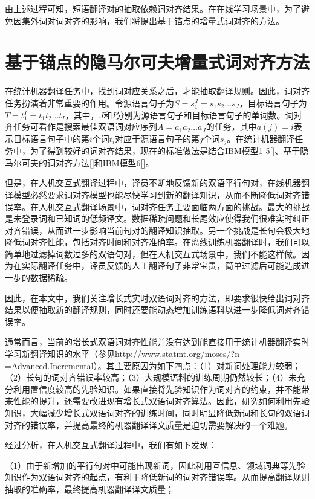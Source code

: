 由上述过程可知，短语翻译对的抽取依赖词对齐结果。在在线学习场景中，为了避免因集外词对词对齐的影响，我们将提出基于锚点的增量式词对齐的方法。

\section{基于锚点的隐马尔可夫增量式词对齐方法}

在统计机器翻译任务中，找到词对应关系之后，才能抽取翻译规则。因此，词对齐任务扮演着非常重要的作用。令源语言句子为$S=s_1^J=s_1s_2\ldots s_J$，目标语言句子为$T=t_1^I=t_1t_2\ldots t_I$，其中，$J$和$I$分别为源语言句子和目标语言句子的单词数。词对齐任务可看作是搜索最佳双语词对应序列$A=a_1a_2\ldots a_J$的任务，其中$a(j)=i$表示目标语言句子中的第$i$个词$t_i$对应于源语言句子的第$j$个词$s_j$。在统计机器翻译任务中，为了得到较好的词对齐结果，现在的标准做法是结合IBM模型1-5[\cite{Brown:1993}]、基于隐马尔可夫的词对齐方法[\cite{Vogel:1996}]和IBM模型6[\cite{Och:2003b}]。

但是，在人机交互式翻译过程中，译员不断地反馈新的双语平行句对，在线机器翻译模型必然要求词对齐模型也能尽快学习到新的翻译知识，从而不断降低词对齐错误率。在人机交互式翻译场景中，词对齐任务主要面临两方面的挑战。最大的挑战是未登录词和已知词的低频译文。数据稀疏问题和长尾效应使得我们很难实时纠正对齐错误，从而进一步影响当前句对的翻译知识抽取。另一个挑战是长句会极大地降低词对齐性能，包括对齐时间和对齐准确率。在离线训练机器翻译时，我们可以简单地过滤掉词数过多的双语句对，但在人机交互式场景中，我们不能这样做。因为在实际翻译任务中，译员反馈的人工翻译句子非常宝贵，简单过滤后可能造成进一步的数据稀疏。

因此，在本文中，我们关注增长式实时双语词对齐的方法，即要求很快给出词对齐结果以便抽取新的翻译规则，同时还要能动态增加训练语料以进一步降低词对齐错误率。

通常而言，当前的增长式双语词对齐性能并没有达到能直接用于统计机器翻译实时学习新翻译知识的水平（参见http://www.statmt.org/moses/?n =Advanced.Incremental）。其主要原因为如下四点：（1）对新词处理能力较弱；（2）长句的词对齐错误率较高；（3）大规模语料的训练周期仍然较长；（4）未充分利用置信度较高的先验知识。如果直接将先验知识作为词对齐的约束，并不能带来性能的提升，还需要改进现有增长式双语词对齐算法。因此，研究如何利用先验知识，大幅减少增长式双语词对齐的训练时间，同时明显降低新词和长句的双语词对齐的错误率，并提高最终的机器翻译译文质量是迫切需要解决的一个难题。

经过分析，在人机交互式翻译过程中，我们有如下发现：

（1）由于新增加的平行句对中可能出现新词，因此利用互信息、领域词典等先验知识作为双语词对齐的起点，有利于降低新词的词对齐错误率。从而提高翻译规则抽取的准确率，最终提高机器翻译译文质量；

